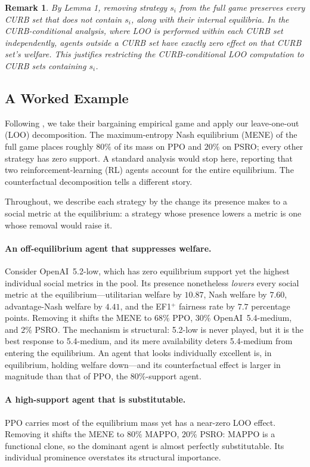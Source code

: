 \documentclass[sigconf,anonymous]{aamas}
\newtheorem{remark}{Remark}
\begin{document}
\begin{remark}
By Lemma 1, removing strategy $s_i$ from the full game preserves every CURB set that does not contain $s_i$, along with their internal equilibria. In the CURB-conditional analysis, where LOO is performed within each CURB set independently, agents outside a CURB set have exactly zero effect on that CURB set's welfare. This justifies restricting the CURB-conditional LOO computation to CURB sets containing $s_i$.
\end{remark}

\subsection{A Worked Example}

Following \citet{smithline2025measuring}, we take their bargaining empirical game and apply our leave-one-out (LOO) decomposition. The maximum-entropy Nash equilibrium (MENE) of the full game places roughly $80\%$ of its mass on PPO and $20\%$ on PSRO; every other strategy has zero support. A standard analysis would stop here, reporting that two reinforcement-learning (RL) agents account for the entire equilibrium. The counterfactual decomposition tells a different story.

Throughout, we describe each strategy by the change its presence makes to a social metric at the equilibrium: a strategy whose presence lowers a metric is one whose removal would raise it.

\paragraph{An off-equilibrium agent that suppresses welfare.} Consider OpenAI~5.2-low, which has zero equilibrium support yet the highest individual social metrics in the pool. Its presence nonetheless \emph{lowers} every social metric at the equilibrium---utilitarian welfare by $10.87$, Nash welfare by $7.60$, advantage-Nash welfare by $4.41$, and the EF1$^+$ fairness rate by $7.7$ percentage points. Removing it shifts the MENE to $68\%$ PPO, $30\%$ OpenAI~5.4-medium, and $2\%$ PSRO. The mechanism is structural: 5.2-low is never played, but it is the best response to 5.4-medium, and its mere availability deters 5.4-medium from entering the equilibrium. An agent that looks individually excellent is, in equilibrium, holding welfare down---and its counterfactual effect is larger in magnitude than that of PPO, the $80\%$-support agent.

\paragraph{A high-support agent that is substitutable.} PPO carries most of the equilibrium mass yet has a near-zero LOO effect. Removing it shifts the MENE to $80\%$ MAPPO, $20\%$ PSRO: MAPPO is a functional clone, so the dominant agent is almost perfectly substitutable. Its individual prominence overstates its structural importance.
\end{document}
